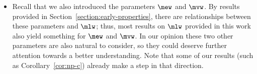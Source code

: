 \documentclass[a4paper,11pt,dvipsnames]{elsarticle}
\newcommand{\sam}[1]{\todo[size=\tiny,color=red!20!white]{\textbf{Sam:} #1}}
\newcommand{\sam}[1]{}
\begin{document}
\begin{itemize}
    \item Recall that we also introduced the parameters $\mew$ and $\mvw$. By results provided in Section~\ref{section:early-properties}, there are relationships between these parameters and $\mlw$; thus, most results on $\mlw$ provided in this work also yield something for $\mew$ and $\mvw$. In our opinion these two other parameters are also natural to consider, so they could deserve further attention towards a better understanding. Note that some of our results (such as Corollary~\ref{cor:np-c}) already make a step in that direction.
\end{itemize}
\end{document}
